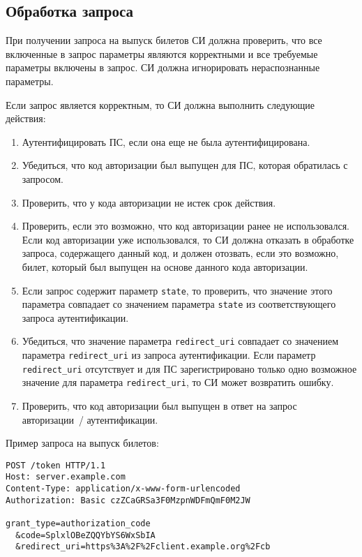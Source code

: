 \label{REQRESP.Token}

\subsection{Обработка запроса}\label{REQRESP.Token.Req}

При получении запроса на выпуск билетов СИ должна проверить, что все включенные в
запрос параметры являются корректными и все требуемые параметры включены в
запрос.
%
СИ должна игнорировать нераспознанные параметры.

Если запрос является корректным, то СИ должна выполнить следующие действия:
\begin{enumerate}
\item 
Аутентифицировать ПС, если она еще не была аутентифицирована.

\item 
Убедиться, что код авторизации был выпущен для ПС, которая обратилась с запросом.

\item
Проверить, что у кода авторизации не истек срок действия.

\item
Проверить, если это возможно, что код авторизации ранее не использовался. Если
код авторизации уже использовался, то СИ должна отказать в обработке запроса,
содержащего данный код, и должен отозвать, если это возможно, билет, который был
выпущен на основе данного кода авторизации.

\item
Если запрос содержит параметр \lstinline{state}, то проверить, что значение
этого параметра совпадает со значением параметра \lstinline{state} из
соответствующего запроса аутентификации.

\item
Убедиться, что значение параметра \lstinline{redirect_uri} совпадает со
значением параметра \lstinline{redirect_uri} из запроса аутентификации. Если
параметр \lstinline{redirect_uri} отсутствует и для ПС зарегистрировано только
одно возможное значение для параметра \lstinline{redirect_uri}, то СИ может
возвратить ошибку.

\item  
Проверить, что код авторизации был выпущен в ответ на запрос авторизации~/ 
аутентификации. 
\end{enumerate}

Пример запроса на выпуск билетов:
\begin{lstlisting}
POST /token HTTP/1.1
Host: server.example.com
Content-Type: application/x-www-form-urlencoded
Authorization: Basic czZCaGRSa3F0MzpnWDFmQmF0M2JW

grant_type=authorization_code
  &code=SplxlOBeZQQYbYS6WxSbIA
  &redirect_uri=https%3A%2F%2Fclient.example.org%2Fcb
\end{lstlisting}

